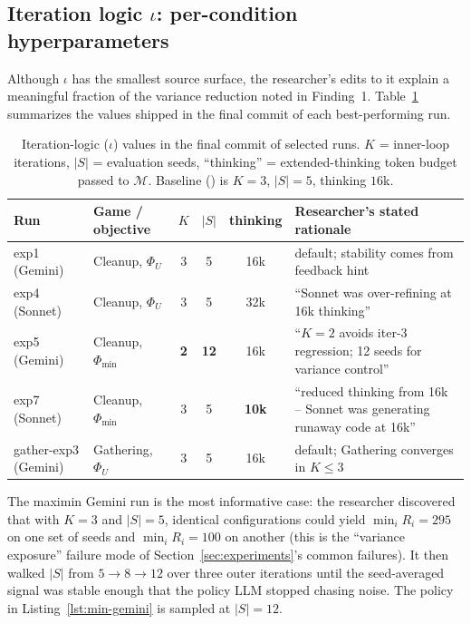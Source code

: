 \documentclass{article}
\newcommand{\cM}{\mathcal{M}}
\begin{document}
\subsection{Iteration logic $\iota$: per-condition hyperparameters}
\label{app:art-config}

Although $\iota$ has the smallest source surface, the researcher's edits to it explain a meaningful fraction of the variance reduction noted in Finding~1. Table~\ref{tab:iota} summarizes the values shipped in the final commit of each best-performing run.

\begin{table}[h]
\caption{Iteration-logic ($\iota$) values in the final commit of selected runs. $K$ = inner-loop iterations, $|S|$ = evaluation seeds, ``thinking'' = extended-thinking token budget passed to $\cM$. Baseline (\cite{gallego2026}) is $K{=}3$, $|S|{=}5$, thinking $16$k.}
\label{tab:iota}
\centering
\footnotesize
\begin{tabular}{@{}llccc l@{}}
\toprule
Run & Game / objective & $K$ & $|S|$ & thinking & Researcher's stated rationale \\
\midrule
exp1 (Gemini)  & Cleanup, $\Phi_U$    & 3 & 5  & 16k & default; stability comes from feedback hint \\
exp4 (Sonnet)  & Cleanup, $\Phi_U$    & 3 & 5  & 32k & ``Sonnet was over-refining at 16k thinking'' \\
exp5 (Gemini)  & Cleanup, $\Phi_{\min}$ & \textbf{2} & \textbf{12} & 16k & ``$K{=}2$ avoids iter-3 regression; 12 seeds for variance control'' \\
exp7 (Sonnet)  & Cleanup, $\Phi_{\min}$ & 3 & 5  & \textbf{10k} & ``reduced thinking from 16k -- Sonnet was generating runaway code at 16k'' \\
gather-exp3 (Gemini) & Gathering, $\Phi_U$ & 3 & 5  & 16k & default; Gathering converges in $K{\le}3$ \\
\bottomrule
\end{tabular}
\end{table}

The maximin Gemini run is the most informative case: the researcher discovered that with $K{=}3$ and $|S|{=}5$, identical configurations could yield $\min_i R_i {=} 295$ on one set of seeds and $\min_i R_i {=} 100$ on another (this is the ``variance exposure'' failure mode of Section~\ref{sec:experiments}'s common failures). It then walked $|S|$ from $5 \to 8 \to 12$ over three outer iterations until the seed-averaged signal was stable enough that the policy LLM stopped chasing noise. The policy in Listing~\ref{lst:min-gemini} is sampled at $|S|{=}12$.
\end{document}
